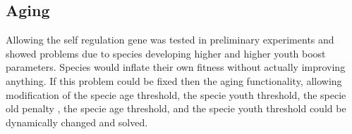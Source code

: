 \documentclass[12pt]{ucthesis} \newif\ifpdf \ifx\pdfoutput\undefined
\begin{document}
\subsection{Aging}

Allowing the self regulation gene was tested in preliminary experiments and
showed problems due to species developing higher and higher youth boost
parameters. Species would inflate their own fitness without actually improving
anything. If this problem could be fixed then the aging functionality, allowing
modification of the specie age threshold, the specie youth threshold, the specie
old penalty , the specie age threshold, and the specie youth threshold could be
dynamically changed and solved.


\clearpage


\end{document}
